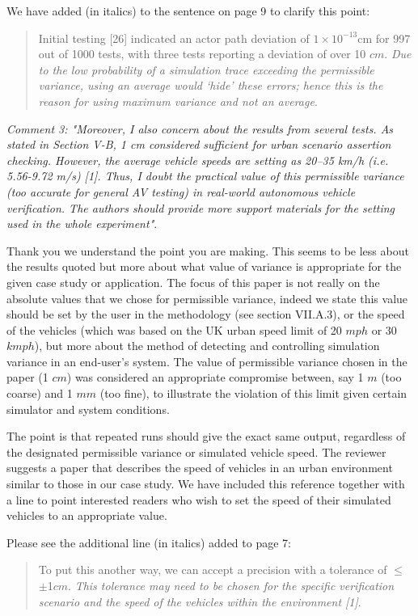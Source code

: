 \documentclass[11pt, a4paper]{letter} %
\begin{document}
\begin{letter}
We have added (in italics) to the sentence on page 9 to clarify this point:  
\begin{quote} 
Initial testing [26] indicated an actor path deviation of $1\times10^{-13}$cm for 997 out of 1000 tests, with three tests reporting a deviation of over 10 $cm$. \textit{Due to the low probability of a simulation trace exceeding the permissible variance, using an average would `hide' these errors; hence this is the reason for using maximum variance and not an average}. 
\end{quote}

\bigskip

\textit{Comment 3: "Moreover, I also concern about the results from several tests. As stated in Section V-B, 1 cm considered sufficient for urban scenario assertion checking. However, the average vehicle speeds are setting as 20–35 km/h (i.e. 5.56-9.72 m/s) [1]. Thus, I doubt the practical value of this permissible variance (too accurate for general AV testing) in real-world autonomous vehicle verification. The authors should provide more support materials for the setting used in the whole experiment"}.

Thank you we understand the point you are making. This seems to be less about the results quoted but more about what value of variance is appropriate for the given case study or application. The focus of this paper is not really on the absolute values that we chose for permissible variance, indeed we state this value should be set by the user in the methodology (see section VII.A.3), or the speed of the vehicles (which was based on the UK urban speed limit of 20 $mph$ or 30 $kmph$), but more about the method of detecting and controlling simulation variance in an end-user's system. The value of permissible variance chosen in the paper (1 $cm$) was considered an appropriate compromise between, say 1 $m$ (too coarse) and 1 $mm$ (too fine), to illustrate the violation of this limit given certain simulator and system conditions.

The point is that repeated runs should give the exact same output, regardless of the designated permissible variance or simulated vehicle speed. The reviewer suggests a paper that describes the speed of vehicles in an urban environment similar to those in our case study. We have included this reference together with a line to point interested readers who wish to set the speed of their simulated vehicles to an appropriate value.

Please see the additional line (in italics) added to page 7: 
\begin{quote}
To put this another way, we can accept a precision with a tolerance of $\leq$$\pm$1$cm$. \textit{This tolerance may need to be chosen for the specific verification scenario and the speed of the vehicles within the environment [1]}.
\end{quote}



\end{letter}
\end{document}
